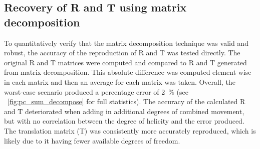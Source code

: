 \documentclass{osa-article}
\begin{document}
\subsection*{Recovery of R and T using matrix decomposition}
To quantitatively verify that the matrix decomposition technique was valid and robust, the accuracy of the reproduction of \gls*{R} and \gls*{T} was tested directly.
The original \gls*{R} and \gls*{T} matrices were computed and compared to \gls*{R} and \gls*{T} generated from matrix decomposition. This absolute difference was computed element-wise in each matrix and then an average for each matrix was taken.
Overall, the worst-case scenario produced a percentage error of \SI{2}{\percent} (see \figurename~\ref{fig:pc_sum_decompose} for full statistics).
The accuracy of the calculated \gls*{R} and \gls*{T} deteriorated when adding in additional degrees of combined movement, but with no correlation between the degree of helicity and the error produced.
The translation matrix (\gls*{T}) was consistently more accurately reproduced, which is likely due to it having fewer available degrees of freedom.


\end{document}
